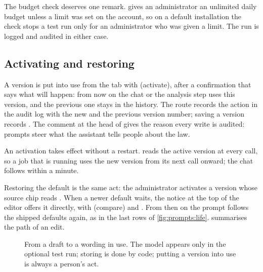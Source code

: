 The budget check deserves one remark.  gives an administrator an unlimited
daily budget unless a limit was set on the account, so on a default installation the check
stops a test run only for an administrator who was given a limit. The run is logged and
audited in either case.

\subsection{Activating and restoring}\label{sec:prompts:activating}

A version is put into use from the  tab with  (activate), after a
confirmation that says what will happen: from now on the chat or the analysis step uses this
version, and the previous one stays in the history. The route  records the
action  in the audit log with the new and the previous version number;
saving a version records . The comment at the head of
 gives the reason every write is audited: prompts steer what the
assistant tells people about the law.

An activation takes effect without a restart.  reads the active version at
every call, so a job that is running uses the new version from its next call onward; the chat
follows within a minute.

Restoring the default is the same act: the administrator activates a version whose source chip
reads . When a newer default waits, the notice at the top of the editor offers
it directly, with  (compare) and . From then on the prompt
follows the shipped defaults again, as in the last rows of \cref{fig:prompts:life}.
 summarises the path of an edit.

\begin{figure}[H]
\centering
{}
\actorlegend
\caption{From a draft to a wording in use. The model appears only in the optional test run;
storing is done by code; putting a version into use is always a person's act.}\label{fig:prompts:edit}
\end{figure}

